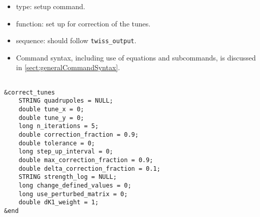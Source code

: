 \documentclass[11pt]{article}
\begin{document}
\begin{itemize}
\item type: setup command.
\item function: set up for correction of the tunes.
\item sequence: should follow \verb|twiss_output|.
\item Command syntax, including use of equations and subcommands, is discussed in \ref{sect:generalCommandSyntax}.
\end{itemize}

\begin{verbatim}

&correct_tunes
    STRING quadrupoles = NULL;
    double tune_x = 0;
    double tune_y = 0;
    long n_iterations = 5;
    double correction_fraction = 0.9;
    double tolerance = 0;
    long step_up_interval = 0;
    double max_correction_fraction = 0.9;
    double delta_correction_fraction = 0.1;
    STRING strength_log = NULL;
    long change_defined_values = 0;
    long use_perturbed_matrix = 0;
    double dK1_weight = 1;
&end
\end{verbatim}
\end{document}
